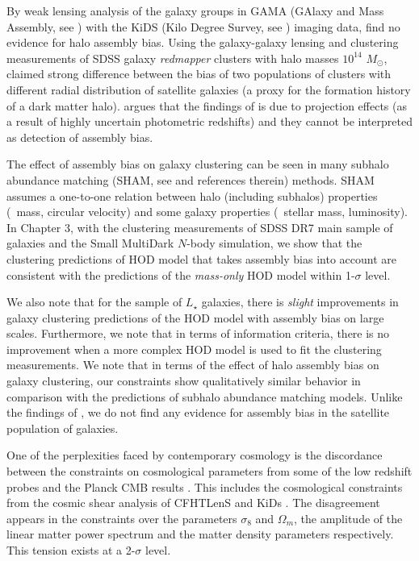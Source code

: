 By weak lensing analysis of the galaxy groups in GAMA (GAlaxy and Mass Assembly, see \citealt{driver}) 
with the KiDS (Kilo Degree Survey, see \citealt{kuijken2015}) imaging data, \citet{dvornik2017} find no evidence for halo assembly bias.
Using the galaxy-galaxy lensing and clustering measurements of SDSS galaxy \emph{redmapper} clusters \citep{rykoff} with halo masses $10^{14}$ $M_{\odot}$, 
\citet{miyatake2016} claimed strong difference between the bias of two populations of clusters with different radial distribution of satellite galaxies 
(a proxy for the formation history of a dark matter halo). \citet{zuetal2016} argues that the findings of \citet{miyatake2016} is due to projection effects (as a result of highly uncertain photometric redshifts) and they cannot be interpreted as detection of assembly bias. 

The effect of assembly bias on galaxy clustering can be seen in many subhalo abundance matching (SHAM, see \citealt{hearin2014,lehman2015} and references therein) methods. SHAM assumes a one-to-one relation between halo (including subhalos) properties (\eg\ mass, circular velocity) and some galaxy properties (\eg\ stellar mass, luminosity). In Chapter 3, with the clustering measurements of SDSS DR7 main sample of galaxies \citep{abazajian2009} and the Small MultiDark $N$-body simulation, we show that the clustering predictions of \citep{decorated} HOD model that takes assembly bias into account are consistent with the predictions of the \emph{mass-only} HOD model within 1-$\sigma$ level. 

We also note that for the sample of $L_{\star}$ galaxies, there is \emph{slight} improvements in galaxy clustering predictions of the HOD model with assembly bias 
on large scales. Furthermore, we note that in terms of information criteria, there is no improvement when a more complex HOD model is used to fit the clustering measurements.
We note that in terms of the effect of halo assembly bias on galaxy clustering, our constraints show qualitatively similar behavior in comparison with the predictions of subhalo abundance matching models. Unlike the findings of \citet{zentner2016}, we do not find any evidence for assembly bias in the satellite population of galaxies.

One of the perplexities faced by contemporary cosmology is the discordance between the constraints on cosmological parameters from some of the low redshift probes and 
the Planck CMB results \citep{planckII}. This includes the cosmological constraints from the cosmic shear analysis of CFHTLenS \citep{heymans,kitching2016} and KiDs \citep{hildebrandt2017}. The disagreement appears in the constraints over the parameters $\sigma_{8}$ and $\Omega_{m}$, the amplitude of the linear matter power spectrum and the matter density parameters respectively. This tension exists at a 2-$\sigma$ level. 

